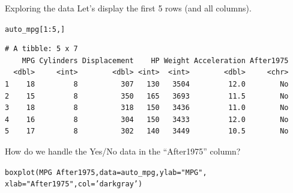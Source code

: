 \documentclass{beamer}\usepackage[]{graphicx}\usepackage[]{color}
\makeatletter
\newcommand{\hlnum}[1]{\textcolor[rgb]{0.824,0.412,0.118}{#1}}%
\newcommand{\hlstr}[1]{\textcolor[rgb]{1,0.894,0.71}{#1}}%
\newcommand{\hlopt}[1]{\textcolor[rgb]{1,0.894,0.769}{#1}}%
\newcommand{\hlstd}[1]{\textcolor[rgb]{1,0.894,0.769}{#1}}%
\newcommand{\hlkwc}[1]{\textcolor[rgb]{0.78,0.941,0.545}{#1}}%
\newcommand{\hlkwd}[1]{\textcolor[rgb]{1,0.78,0.769}{#1}}%
\newenvironment{kframe}{%
 \def\at@end@of@kframe{}%
 \ifinner\ifhmode%
  \def\at@end@of@kframe{\end{minipage}}%
  \begin{minipage}{\columnwidth}%
 \fi\fi%
 \def\FrameCommand##1{\hskip\@totalleftmargin \hskip-\fboxsep
 \colorbox{shadecolor}{##1}\hskip-\fboxsep
     \hskip-\linewidth \hskip-\@totalleftmargin \hskip\columnwidth}%
 \MakeFramed {\advance\hsize-\width
   \@totalleftmargin\z@ \linewidth\hsize
   \@setminipage}}%
 {\par\unskip\endMakeFramed%
 \at@end@of@kframe}
\newenvironment{knitrout}{}{} %
\makeatother
\begin{document}
\begin{darkframes}
    
\begin{frame}[fragile]{Exploring the data}
      \fontsize{9}{9}\selectfont
      Let's display the first 5 rows (and all columns).
\begin{knitrout}
\begin{kframe}
\begin{alltt}
\hlstd{auto_mpg[}\hlnum{1}\hlopt{:}\hlnum{5}\hlstd{,]}
\end{alltt}
\begin{verbatim}
# A tibble: 5 x 7
    MPG Cylinders Displacement    HP Weight Acceleration After1975
  <dbl>     <int>        <dbl> <int>  <int>        <dbl>     <chr>
1    18         8          307   130   3504         12.0        No
2    15         8          350   165   3693         11.5        No
3    18         8          318   150   3436         11.0        No
4    16         8          304   150   3433         12.0        No
5    17         8          302   140   3449         10.5        No
\end{verbatim}
\end{kframe}
\end{knitrout}
      \pause
      How do we handle the Yes/No data in the ``After1975'' column?
\end{frame}
    
    
    
    
\begin{frame}[fragile]%
\begin{knitrout}
\begin{kframe}
\begin{alltt}
\hlkwd{boxplot}\hlstd{(MPG} \hlopt{~} \hlstd{After1975,} \hlkwc{data}\hlstd{=auto_mpg,} \hlkwc{ylab}\hlstd{=}\hlstr{"MPG"}\hlstd{,}
              \hlkwc{xlab}\hlstd{=}\hlstr{"After 1975"}\hlstd{,} \hlkwc{col}\hlstd{=}\hlstr{'darkgray'}\hlstd{)}
\end{alltt}
\end{kframe}


\end{knitrout}
      
\end{frame}
    
    
    

\end{darkframes}
\end{document}
